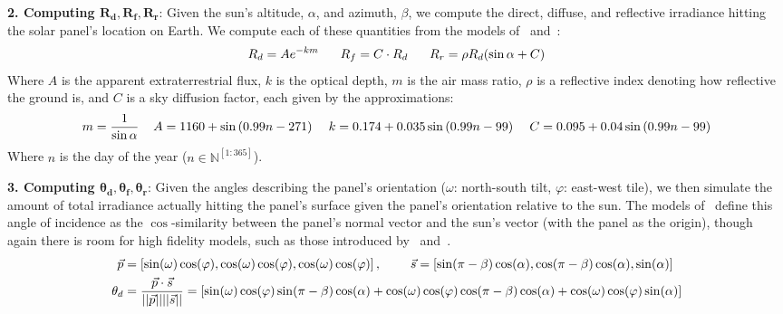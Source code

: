 \documentclass[11pt]{article}
\begin{document}
{\bf 2. Computing $\pmb{R_d, R_f, R_r}$}: Given the sun's altitude, $\alpha$, and azimuth, $\beta$, we compute the direct, diffuse, and reflective irradiance hitting the solar panel's location on Earth. We compute each of these quantities from the models of~\citet{threlkeld1957direct,Liu1960} and~\citet{masters2013renewable}:
\begin{align*}
R_d = A e^{-km} \hspace{6mm} R_f = C \cdot R_d \hspace{6mm} R_r = \rho R_d (\sin \alpha + C)
\end{align*}
Where $A$ is the apparent extraterrestrial flux, $k$ is the optical depth, $m$ is the air mass ratio, $\rho$ is a reflective index denoting how reflective the ground is, and $C$ is a sky diffusion factor, each given by the approximations:
\begin{align*}
m = \frac{1}{\sin \alpha} \hspace{4mm} A = 1160 + \sin \left(0.99 n- 271\right) \hspace{4mm} k=0.174 + 0.035 \sin\left( 0.99 n - 99\right) \hspace{4mm} C=0.095 + 0.04 \sin\left(0.99 n-99\right)
\end{align*}
Where $n$ is the day of the year ($n \in \mathbb{N}^{[1:365]}$).

{\bf 3. Computing $\pmb{\theta_d, \theta_f, \theta_r}$}: Given the angles describing the panel's orientation ($\omega$: north-south tilt, $\varphi$: east-west tile), we then simulate the amount of total irradiance actually hitting the panel's surface given the panel's orientation relative to the sun. The models of~\citet{masters2013renewable} define this angle of incidence as the $\cos$-similarity between the panel's normal vector and the sun's vector (with the panel as the origin), though again there is room for high fidelity models, such as those introduced by~\citet{andersen1980comments} and~\citet{klein1977calculation}.
\begin{align*}
\vec{p} &= \left[ \sin(\omega)  \cos(\varphi), \cos(\omega)  \cos(\varphi), \cos(\omega) \cos(\varphi) \right], \hspace{8mm} \vec{s} = \left[ \sin(\pi - \beta)  \cos(\alpha), \cos(\pi - \beta)  \cos(\alpha), \sin(\alpha) \right] \\
\theta_d &= \frac{\vec{p} \cdot \vec{s}}{||\vec{p}|| ||\vec{s} ||} = \left[ \sin(\omega)  \cos(\varphi)  \sin(\pi - \beta)  \cos(\alpha) + \cos(\omega)  \cos(\varphi)  \cos(\pi - \beta)  \cos(\alpha) +  \cos(\omega) \cos(\varphi)  \sin(\alpha)  \right]
\end{align*}
\end{document}
